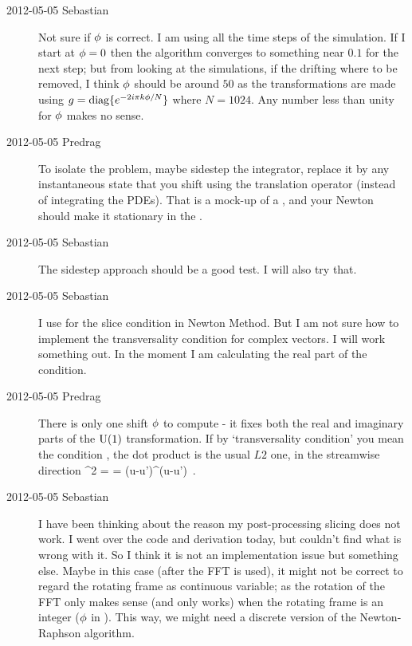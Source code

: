 \begin{description}
\item[2012-05-05 Sebastian]
Not sure if ${\bf \phi}$ is correct. I am using all the time steps of the
simulation. If I start at ${\bf \phi}=0$ then the algorithm converges to
something near $0.1$  for the next step; but from looking at the
simulations, if the drifting where to be removed, I think ${\bf \phi}$
should be around $50$ as the transformations are made using
$g=\textrm{diag}\{e^{-2 i \pi k {\bf \phi}/N}\}$ where $N=1024$. Any
number less than unity for ${\bf \phi}$ makes no sense.
\item[2012-05-05 Predrag]
To isolate the problem, maybe sidestep the integrator, replace it by any
instantaneous state that you shift using the translation operator
(instead of integrating the PDEs). That is a mock-up of a \reqv, and your
Newton should make it stationary in the \slice.
\item[2012-05-05 Sebastian]
The sidestep approach should be a good test. I will also try that.

\item[2012-05-05 Sebastian]
I use  for the slice condition in Newton Method. But I am not
sure how to implement the transversality condition for complex vectors. I
will work something out. In the moment I am calculating the real part of
the condition.

\item[2012-05-05 Predrag] There is only one shift ${\bf \phi}$ to compute -
it fixes both the real and imaginary parts of the $\textrm{U}(1)$
transformation. If by `transversality condition' you mean the
{\chartBord} condition , the dot product is the usual
$L2$ one, in the streamwise direction
\beq
  ^2  =  =
\Lint{\pSpace} ({u}-{u}')^\dagger \cdot ({u}-{u}')
\,.
\label{CmplxNorm}
\eeq

\item[2012-05-05 Sebastian]
I have been thinking about the reason my post-processing slicing does not
work. I went over the code and derivation today, but couldn't find what
is wrong with it.
So I think it is not an implementation issue but something else.  Maybe
in this case (after the FFT is used), it might not be correct to regard
the rotating frame as continuous variable; as the rotation of the FFT
only makes sense (and only works) when the rotating frame is an integer
(${\bf \phi}$ in ). This way, we might need a discrete version
of the Newton-Raphson algorithm.


\end{description}
